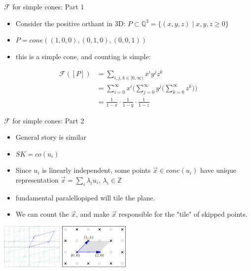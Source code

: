 \documentclass[8pt]{beamer}
\begin{document}
\begin{frame}[label=sec-10]{$\mathcal{F}$ for simple cones: Part 1}
\begin{itemize}
\item Consider the positive orthant in 3D: $P \subset \mathbb{Q}^3 = \Big\{(x, y, z) \mid x, y, z \geq 0 \Big\}$
\item $P = cone((1, 0, 0), (0, 1, 0), (0, 0, 1))$
\item this is a simple cone, and counting is simple:
\end{itemize}

\begin{align*}
\mathcal{F}([P]) &= \sum_{i, j, k \in [0, \infty)} x^i y^j z^k \\
                 &= \sum_{i=0}^\infty x^i \Bigg(\sum_{j=0}^\infty y^j \Bigg(\sum_{k=0}^\infty z^k\Bigg)\Bigg) \\
                 &= \frac{1}{1 - x} \cdot \frac{1}{1 - y} \cdot \frac{1}{1 - z}
\end{align*}
\end{frame}


\begin{frame}[label=sec-11]{$\mathcal{F}$ for simple cones: Part 2}
\begin{itemize}
\item General story is similar
\item $SK = co(u_i)$
\item Since $u_i$ is linearly independent, some points $\vec{x} \in cone(u_i)$ have unique representation  $\vec x = \sum_i \lambda_i u_i$, $\lambda_i \in \mathbb{Z}$
\item fundamental paralellopiped will tile the plane.
\item We can count the $\vec{x}$, and make $\vec{x}$ responsible for the "tile" of skipped points.
\end{itemize}

\begin{center}
 \includegraphics[width=3cm, keepaspectratio]{res/fundamental-paralellopiped-tiled}
 \includegraphics[width=3.40cm, keepaspectratio]{res/fundamental-parallelopiped.png}
\end{center}
\end{frame}
\end{document}
